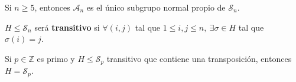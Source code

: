 \begin{coro}
Si $n \ge 5$, entonces $\mathcal{A}_n$ es el único subgrupo normal propio de $\mathcal{S}_n$.
\end{coro}

\begin{defi}
$H \le \mathcal{S}_n$ será \textbf{transitivo} si $\forall \left( i, j \right)$ tal que $1 \le i, j \le n,\ \exists \sigma \in H$ tal que $\sigma \left( i \right) = j$.
\end{defi}

\begin{prop}
Si $p \in \mathbb{Z}$ es primo y $H \le \mathcal{S}_p$ transitivo que contiene una transposición, entonces $H = \mathcal{S}_p$.
\end{prop}
